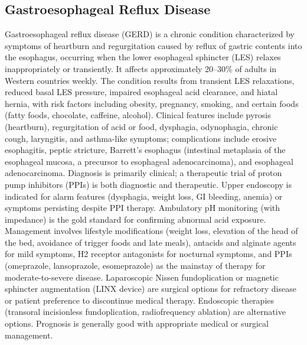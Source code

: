 \label{sec:section:Gastroesophageal Reflux Disease}

\subsection{Gastroesophageal Reflux Disease}
\label{sec:Gastroesophageal Reflux Disease}
Gastroesophageal reflux disease (GERD) is a chronic condition characterized by symptoms of heartburn and regurgitation caused by reflux of gastric contents into the esophagus, occurring when the lower esophageal sphincter (LES) relaxes inappropriately or transiently. It affects approximately 20--30\% of adults in Western countries weekly. The condition results from transient LES relaxations, reduced basal LES pressure, impaired esophageal acid clearance, and hiatal hernia, with risk factors including obesity, pregnancy, smoking, and certain foods (fatty foods, chocolate, caffeine, alcohol). Clinical features include pyrosis (heartburn), regurgitation of acid or food, dysphagia, odynophagia, chronic cough, laryngitis, and asthma-like symptoms; complications include erosive esophagitis, peptic stricture, Barrett's esophagus (intestinal metaplasia of the esophageal mucosa, a precursor to esophageal adenocarcinoma), and esophageal adenocarcinoma. Diagnosis is primarily clinical; a therapeutic trial of proton pump inhibitors (PPIs) is both diagnostic and therapeutic. Upper endoscopy is indicated for alarm features (dysphagia, weight loss, GI bleeding, anemia) or symptoms persisting despite PPI therapy. Ambulatory pH monitoring (with impedance) is the gold standard for confirming abnormal acid exposure. Management involves lifestyle modifications (weight loss, elevation of the head of the bed, avoidance of trigger foods and late meals), antacids and alginate agents for mild symptoms, H2 receptor antagonists for nocturnal symptoms, and PPIs (omeprazole, lansoprazole, esomeprazole) as the mainstay of therapy for moderate-to-severe disease. Laparoscopic Nissen fundoplication or magnetic sphincter augmentation (LINX device) are surgical options for refractory disease or patient preference to discontinue medical therapy. Endoscopic therapies (transoral incisionless fundoplication, radiofrequency ablation) are alternative options. Prognosis is generally good with appropriate medical or surgical management.

